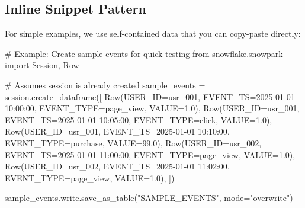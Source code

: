 \documentclass[
  letterpaper,
  DIV=11,
  numbers=noendperiod]{scrreprt}
\newenvironment{Shaded}{\begin{snugshade}}{\end{snugshade}}
\newcommand{\CommentTok}[1]{\textcolor[rgb]{0.37,0.37,0.37}{#1}}
\newcommand{\FloatTok}[1]{\textcolor[rgb]{0.68,0.00,0.00}{#1}}
\newcommand{\ImportTok}[1]{\textcolor[rgb]{0.00,0.46,0.62}{#1}}
\newcommand{\NormalTok}[1]{\textcolor[rgb]{0.00,0.23,0.31}{#1}}
\newcommand{\OperatorTok}[1]{\textcolor[rgb]{0.37,0.37,0.37}{#1}}
\newcommand{\StringTok}[1]{\textcolor[rgb]{0.13,0.47,0.30}{#1}}
\begin{document}
\hypertarget{inline-snippet-pattern}{%
\subsection{Inline Snippet Pattern}\label{inline-snippet-pattern}}

For simple examples, we use self-contained data that you can copy-paste
directly:

\begin{Shaded}
\begin{Highlighting}[]
\CommentTok{\# Example: Create sample events for quick testing}
\ImportTok{from}\NormalTok{ snowflake.snowpark }\ImportTok{import}\NormalTok{ Session, Row}

\CommentTok{\# Assumes session is already created}
\NormalTok{sample\_events }\OperatorTok{=}\NormalTok{ session.create\_dataframe([}
\NormalTok{    Row(USER\_ID}\OperatorTok{=}\StringTok{\textquotesingle{}usr\_001\textquotesingle{}}\NormalTok{, EVENT\_TS}\OperatorTok{=}\StringTok{\textquotesingle{}2025{-}01{-}01 10:00:00\textquotesingle{}}\NormalTok{, EVENT\_TYPE}\OperatorTok{=}\StringTok{\textquotesingle{}page\_view\textquotesingle{}}\NormalTok{, VALUE}\OperatorTok{=}\FloatTok{1.0}\NormalTok{),}
\NormalTok{    Row(USER\_ID}\OperatorTok{=}\StringTok{\textquotesingle{}usr\_001\textquotesingle{}}\NormalTok{, EVENT\_TS}\OperatorTok{=}\StringTok{\textquotesingle{}2025{-}01{-}01 10:05:00\textquotesingle{}}\NormalTok{, EVENT\_TYPE}\OperatorTok{=}\StringTok{\textquotesingle{}click\textquotesingle{}}\NormalTok{, VALUE}\OperatorTok{=}\FloatTok{1.0}\NormalTok{),}
\NormalTok{    Row(USER\_ID}\OperatorTok{=}\StringTok{\textquotesingle{}usr\_001\textquotesingle{}}\NormalTok{, EVENT\_TS}\OperatorTok{=}\StringTok{\textquotesingle{}2025{-}01{-}01 10:10:00\textquotesingle{}}\NormalTok{, EVENT\_TYPE}\OperatorTok{=}\StringTok{\textquotesingle{}purchase\textquotesingle{}}\NormalTok{, VALUE}\OperatorTok{=}\FloatTok{99.0}\NormalTok{),}
\NormalTok{    Row(USER\_ID}\OperatorTok{=}\StringTok{\textquotesingle{}usr\_002\textquotesingle{}}\NormalTok{, EVENT\_TS}\OperatorTok{=}\StringTok{\textquotesingle{}2025{-}01{-}01 11:00:00\textquotesingle{}}\NormalTok{, EVENT\_TYPE}\OperatorTok{=}\StringTok{\textquotesingle{}page\_view\textquotesingle{}}\NormalTok{, VALUE}\OperatorTok{=}\FloatTok{1.0}\NormalTok{),}
\NormalTok{    Row(USER\_ID}\OperatorTok{=}\StringTok{\textquotesingle{}usr\_002\textquotesingle{}}\NormalTok{, EVENT\_TS}\OperatorTok{=}\StringTok{\textquotesingle{}2025{-}01{-}01 11:02:00\textquotesingle{}}\NormalTok{, EVENT\_TYPE}\OperatorTok{=}\StringTok{\textquotesingle{}page\_view\textquotesingle{}}\NormalTok{, VALUE}\OperatorTok{=}\FloatTok{1.0}\NormalTok{),}
\NormalTok{])}

\NormalTok{sample\_events.write.save\_as\_table(}\StringTok{"SAMPLE\_EVENTS"}\NormalTok{, mode}\OperatorTok{=}\StringTok{"overwrite"}\NormalTok{)}
\end{Highlighting}
\end{Shaded}
\end{document}
